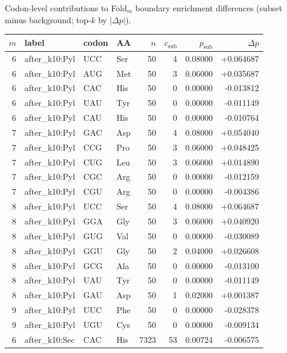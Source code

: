 Codon-level contributions to Fold$_m$ boundary enrichment differences (subset minus background; top-$k$ by $|\Delta p|$).

\begingroup
{}
\scriptsize
\setlength{\tabcolsep}{4pt}
\renewcommand{\arraystretch}{1.10}
\setlength{\LTleft}{0pt}
\setlength{\LTright}{0pt}
\begin{longtable}{r l l l r r r r}
\toprule
$m$ & label & codon & AA & $n$ & $c_{\mathrm{sub}}$ & $p_{\mathrm{sub}}$ & $\Delta p$ \\
\midrule
6 & after\_k10:Pyl & UCC & Ser & 50 & 4 & 0.08000 & +0.064687 \\
6 & after\_k10:Pyl & AUG & Met & 50 & 3 & 0.06000 & +0.035687 \\
6 & after\_k10:Pyl & CAC & His & 50 & 0 & 0.00000 & -0.013812 \\
6 & after\_k10:Pyl & UAU & Tyr & 50 & 0 & 0.00000 & -0.011149 \\
6 & after\_k10:Pyl & CAU & His & 50 & 0 & 0.00000 & -0.010764 \\
7 & after\_k10:Pyl & GAC & Asp & 50 & 4 & 0.08000 & +0.054040 \\
7 & after\_k10:Pyl & CCG & Pro & 50 & 3 & 0.06000 & +0.048425 \\
7 & after\_k10:Pyl & CUG & Leu & 50 & 3 & 0.06000 & +0.014890 \\
7 & after\_k10:Pyl & CGC & Arg & 50 & 0 & 0.00000 & -0.012159 \\
7 & after\_k10:Pyl & CGU & Arg & 50 & 0 & 0.00000 & -0.004386 \\
8 & after\_k10:Pyl & UCC & Ser & 50 & 4 & 0.08000 & +0.064687 \\
8 & after\_k10:Pyl & GGA & Gly & 50 & 3 & 0.06000 & +0.040920 \\
8 & after\_k10:Pyl & GUG & Val & 50 & 0 & 0.00000 & -0.030089 \\
8 & after\_k10:Pyl & GGU & Gly & 50 & 2 & 0.04000 & +0.026608 \\
8 & after\_k10:Pyl & GCG & Ala & 50 & 0 & 0.00000 & -0.013100 \\
8 & after\_k10:Pyl & UAU & Tyr & 50 & 0 & 0.00000 & -0.011149 \\
8 & after\_k10:Pyl & GAU & Asp & 50 & 1 & 0.02000 & +0.001387 \\
9 & after\_k10:Pyl & UUC & Phe & 50 & 0 & 0.00000 & -0.028378 \\
9 & after\_k10:Pyl & UGU & Cys & 50 & 0 & 0.00000 & -0.009134 \\
6 & after\_k10:Sec & CAC & His & 7323 & 53 & 0.00724 & -0.006575 \\

\end{longtable}
